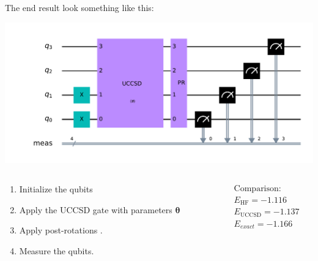 \documentclass{beamer}
\renewcommand{\(}{\left(}
\renewcommand{\)}{\right)}
\renewcommand{\[}{\left[}
\renewcommand{\]}{\right]}
\begin{document}
\begin{frame}
    \frametitle{}
    The end result look something like this: 
    \begin{center}
        \includegraphics[scale=0.445, trim = 65 0 0 0 , clip]{ussd.pdf}
    \end{center}
    \begin{columns}
        \begin{column}[]{0.7\textwidth}
            \begin{enumerate}
                \item Initialize the qubits 
                \item Apply the UCCSD gate with parameters $\bm \theta$
                \item Apply post-rotations .
                \item Measure the qubits.
            \end{enumerate}
        \end{column}
        \begin{column}[]{0.3\textwidth}
            \begin{align*}
                &\text{Comparison:}\\
                &E_{\text{HF}} = -1.116\\
                &E_{\text{UCCSD}} = -1.137 \\ 
                &E_{exact} = -1.166
            \end{align*}
        \end{column}
    \end{columns}
\end{frame}
\end{document}

